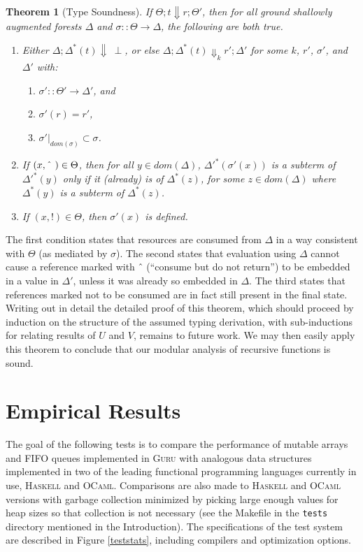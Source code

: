 \documentclass[9pt,natbib]{sigplanconf}
\newtheorem{theorem}{Theorem}
\begin{document}
\begin{theorem}[Type Soundness]
If $\Theta; t \Downarrow r; \Theta'$, then for all ground shallowly
augmented forests $\Delta$ and $\sigma::\Theta\to\Delta$, the
following are both true.
\begin{enumerate}
\item Either $\Delta; \Delta^*(t) \Downarrow\ \perp$, or else $\Delta;
  \Delta^*(t)\Downarrow_k r'; \Delta'$ for some $k$, $r'$, $\sigma'$, and
  $\Delta'$ with:
\begin{enumerate}
\item $\sigma'::\Theta'\to\Delta'$, and
\item $\sigma'(r) = r'$,
\item $\sigma'|_{\textit{dom}(\sigma)} \subset \sigma$.
\end{enumerate}
\item If $(x,\textnormal{\^{\ }})\in\Theta$, then for all
  $y\in\textit{dom}(\Delta)$, $\Delta'^*(\sigma'(x))$ is a
  subterm of $\Delta'^*(y)$ only if it (already) is of $\Delta^*(z)$,
  for some $z\in\textit{dom}(\Delta)$ where $\Delta^*(y)$ is a subterm
  of $\Delta^*(z)$.
\item If $(x,!)\in\Theta$, then $\sigma'(x)$ is defined.
\end{enumerate}
\end{theorem}

\noindent The first condition states that resources are consumed from
$\Delta$ in a way consistent with $\Theta$ (as mediated by $\sigma$).
The second states that evaluation using $\Delta$ cannot cause a
reference marked with \^{\ } (``consume but do not return'') to be
embedded in a value in $\Delta'$, unless it was already so embedded in
$\Delta$.  The third states that references marked not to be consumed
are in fact still present in the final state.  Writing out in detail
the detailed proof of this theorem, which should proceed by induction
on the structure of the assumed typing derivation, with sub-inductions
for relating results of $U$ and $V$, remains to future work.  We may
then easily apply this theorem to conclude that our modular analysis
of recursive functions is sound.

\section{Empirical Results}
\label{sec:emp}

The goal of the following tests is to compare the performance of
mutable arrays and FIFO queues implemented in \textsc{Guru} with
analogous data structures implemented in two of the leading functional
programming languages currently in use, \textsc{Haskell} and
\textsc{OCaml}.  Comparisons are also made to \textsc{Haskell} and
\textsc{OCaml} versions with garbage collection minimized by picking
large enough values for heap sizes so that collection is not necessary
(see the Makefile in the \texttt{tests} directory mentioned in the
Introduction).  The specifications of the test system are described in
Figure \ref{teststats}, including compilers and optimization options.
\end{document}
